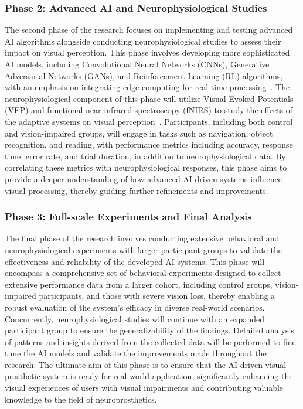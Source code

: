 \documentclass[10pt]{article}
\begin{document}
\subsubsection*{Phase 2: Advanced AI and Neurophysiological Studies}
The second phase of the research focuses on implementing and testing advanced AI
algorithms alongside conducting neurophysiological studies to assess their
impact on visual perception. This phase involves developing more sophisticated
AI models, including Convolutional Neural Networks (CNNs), Generative
Adversarial Networks (GANs), and Reinforcement Learning (RL) algorithms, with an
emphasis on integrating edge computing for real-time
processing~\parencite{granleyAdaptingBrainLikeNeural2022,elnabawyPVGANGenerativeAdversarial2022}.
The neurophysiological component of this phase will utilize Visual Evoked
Potentials (VEP) and functional near-infrared spectroscopy (fNIRS) to study the
effects of the adaptive systems on visual
perception~\parencite{martinez-cagigalBrainComputerInterfaces2021,klistornerAnalysisMultifocalVisual2022,chenNeuralCorrelatesObstacle2017}.
Participants, including both control and vision-impaired groups, will engage in
tasks such as navigation, object recognition, and reading, with performance
metrics including accuracy, response time, error rate, and trial duration, in
addition to neurophysiological data. By correlating these metrics with
neurophysiological responses, this phase aims to provide a deeper understanding
of how advanced AI-driven systems influence visual processing, thereby guiding
further refinements and improvements.

\subsubsection*{Phase 3: Full-scale Experiments and Final Analysis}
The final phase of the research involves conducting extensive behavioral and
neurophysiological experiments with larger participant groups to validate the
effectiveness and reliability of the developed AI systems. This phase will
encompass a comprehensive set of behavioral experiments designed to collect
extensive performance data from a larger cohort, including control groups,
vision-impaired participants, and those with severe vision loss, thereby
enabling a robust evaluation of the system's efficacy in diverse real-world
scenarios. Concurrently, neurophysiological studies will continue with an
expanded participant group to ensure the generalizability of the findings.
Detailed analysis of patterns and insights derived from the collected data will
be performed to fine-tune the AI models and validate the improvements made
throughout the research. The ultimate aim of this phase is to ensure that the
AI-driven visual prosthetic system is ready for real-world application,
significantly enhancing the visual experiences of users with visual impairments
and contributing valuable knowledge to the field of neuroprosthetics.
\end{document}
